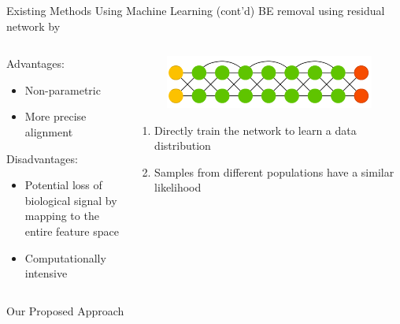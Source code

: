 \documentclass{beamer}
\begin{document}
\begin{frame}{Existing Methods Using Machine Learning (cont'd)}
  BE removal using residual network by \citeauthor*{Shaham2017} \citeyear{Shaham2017}
  \vspace{0.5cm}
  \begin{columns}
    \begin{column}[t]{.48\textwidth}
      Advantages:
      \begin{itemize}
        \item Non-parametric
        \item More precise alignment
      \end{itemize}
      Disadvantages:
      \begin{itemize}
        \item Potential loss  of biological signal  by mapping to the entire feature space
        \item Computationally intensive
      \end{itemize}
    \end{column}
    \begin{column}[t]{.48\textwidth}
      \vspace{-1cm}
      \begin{figure}[ht]
        \centering
        \includegraphics[width=1.0\textwidth,height=0.5\textheight,keepaspectratio]{figures/drn.png}
        \vspace*{-0.8cm}\caption*{\label{fig:be-drn}}
      \end{figure}
      \begin{enumerate}
        \item Directly train the network to learn a data distribution
        \item Samples from different populations have a similar likelihood
      \end{enumerate}
    \end{column}
  \end{columns}
\end{frame}
\begin{frame}{Our Proposed Approach}
  \begin{figure}[ht]
    \centering
    \scalebox{0.9}{}
    \caption*{\label{fig:workflow}}
  \end{figure}
\end{frame}
\end{document}
